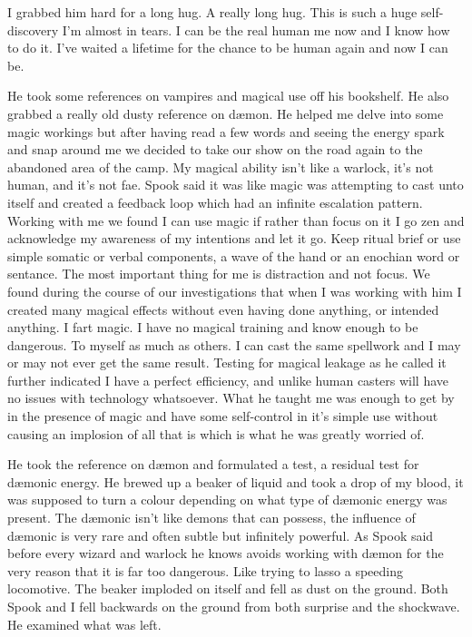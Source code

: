 I grabbed him hard for a long hug. A really long hug. This is such a huge self-discovery I'm almost in tears. I can be the real human me now and I know how to do it. I've waited a lifetime for the chance to be human again and now I can be.

He took some references on vampires and magical use off his bookshelf. He also grabbed a really old dusty reference on d\ae mon. He helped me delve into some magic workings but after having read a few words and seeing the energy spark and snap around me we decided to take our show on the road again to the abandoned area of the camp. My magical ability isn't like a warlock, it's not human, and it's not fae. Spook said it was like magic was attempting to cast unto itself and created a feedback loop which had an infinite escalation pattern. Working with me we found I can use magic if rather than focus on it I go zen and acknowledge my awareness of my intentions and let it go. Keep ritual brief or use simple somatic or verbal components, a wave of the hand or an enochian word or sentance. The most important thing for me is distraction and not focus. We found during the course of our investigations that when I was working with him I created many magical effects without even having done anything, or intended anything. I fart magic. I have no magical training and know enough to be dangerous. To myself as much as others. I can cast the same spellwork and I may or may not ever get the same result. Testing for magical leakage as he called it further indicated I have a perfect efficiency, and unlike human casters will have no issues with technology whatsoever. What he taught me was enough to get by in the presence of magic and have some self-control in it's simple use without causing an implosion of all that is which is what he was greatly worried of.

He took the reference on d\ae mon and formulated a test, a residual test for d\ae monic energy. He brewed up a beaker of liquid and took a drop of my blood, it was supposed to turn a colour depending on what type of d\ae monic energy was present. The d\ae monic isn't like demons that can possess, the influence of d\ae monic is very rare and often subtle but infinitely powerful. As Spook said before every wizard and warlock he knows avoids working with d\ae mon for the very reason that it is far too dangerous. Like trying to lasso a speeding locomotive. The beaker imploded on itself and fell as dust on the ground. Both Spook and I fell backwards on the ground from both surprise and the shockwave. He examined what was left.

